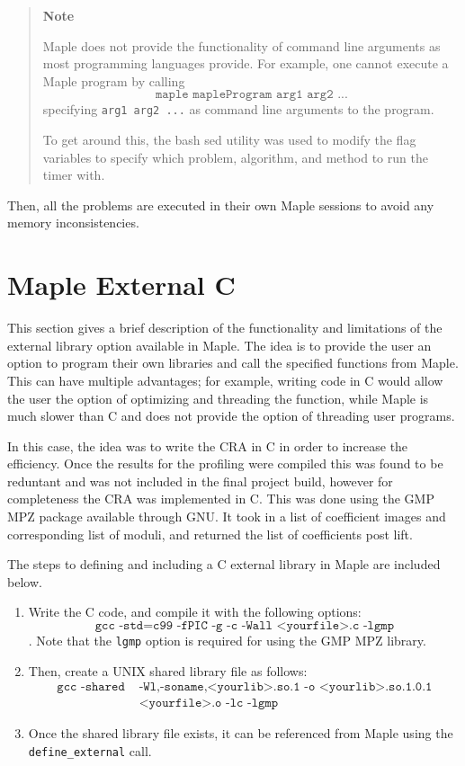 \documentclass[letterpaper,12pt,titlepage,oneside,final]{book}
\newenvironment{note}{\begin{quote}%
  \textbf{Note }%
  \quad
}{%
\end{quote}%
}
\begin{document}
\begin{appendices}
\begin{note}
  Maple does not provide the functionality of command line arguments as most programming languages provide.  For example, one cannot execute a Maple program by calling \begin{equation*}\texttt{maple mapleProgram arg1 arg2 ...}\end{equation*} specifying \texttt{arg1 arg2 ...} as command line arguments to the program.

  To get around this, the bash sed utility was used to modify the flag variables to specify which problem, algorithm, and method to run the timer with.
\end{note}

Then, all the problems are executed in their own Maple sessions to avoid any memory inconsistencies.

\section{Maple External C}

This section gives a brief description of the functionality and limitations of the external library option available in Maple.  The idea is to provide the user an option to program their own libraries and call the specified functions from Maple.  This can have multiple advantages; for example, writing code in C would allow the user the option of optimizing and threading the function, while Maple is much slower than C and does not provide the option of threading user programs.  

In this case, the idea was to write the CRA in C in order to increase the efficiency.  Once the results for the profiling were compiled this was found to be reduntant and was not included in the final project build, however for completeness the CRA was implemented in C.  This was done using the GMP MPZ package available through GNU.  It took in a list of coefficient images and corresponding list of moduli, and returned the list of coefficients post lift.

The steps to defining and including a C external library in Maple are included below.  

\begin{enumerate}
  \item Write the C code, and compile it with the following options: $$\texttt{gcc -std=c99 -fPIC -g -c -Wall <yourfile>.c -lgmp}$$.  Note that the \texttt{lgmp} option is required for using the GMP MPZ library.
  \item Then, create a UNIX shared library file as follows: \begin{align*}\texttt{gcc -shared} & \texttt{ -Wl,-soname,<yourlib>.so.1 -o <yourlib>.so.1.0.1} \\
                                                                          &\texttt{ <yourfile>.o -lc -lgmp}\end{align*}
  \item Once the shared library file exists, it can be referenced from Maple using the \\\texttt{define\_external} call.  
\end{enumerate}


\end{appendices}
\end{document}
